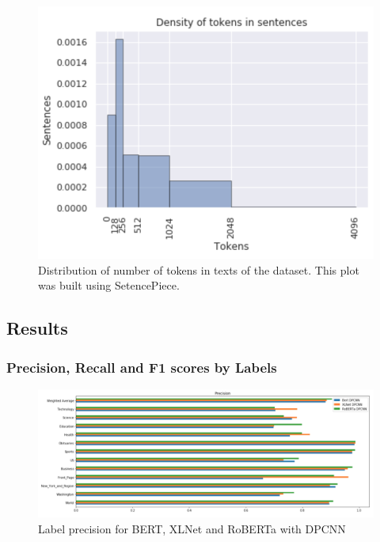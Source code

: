 \documentclass{article}
\begin{document}
\begin{figure}[!htb]
    \centering
    \includegraphics[scale=0.6]{images/density_tokens.png}
    \caption{Distribution of number of tokens in texts of the dataset. This plot was built using SetencePiece.}
    \label{fig:density_tokens}
\end{figure}

\subsection{Results} \label{apendix_results}

\subsubsection{Precision, Recall and F1 scores by Labels}

\begin{figure}[!htb]
    \centering
    \includegraphics[scale=0.6]{images/precision_labels_all_models.png}
    \caption{Label precision for BERT, XLNet and RoBERTa with DPCNN}
    \label{fig:precision_labels_all_models}
\end{figure}
\end{document}
